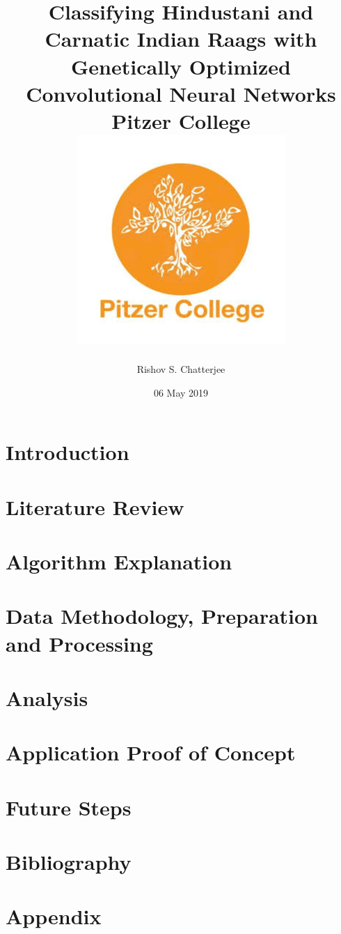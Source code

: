 \documentclass[12pt]{report}
\title{
{Classifying Hindustani and Carnatic Indian Raags with Genetically Optimized Convolutional Neural Networks}\\
{\large Pitzer College}\\
{\includegraphics{university_1.png}}
}
\author{Rishov S. Chatterjee}
\date{06 May 2019}
\begin{document}
\maketitle{}
\chapter{Introduction}


\chapter{Literature Review}


\chapter{Algorithm Explanation}


\chapter{Data Methodology, Preparation and Processing}


\chapter{Analysis}


\chapter{Application Proof of Concept}


\chapter{Future Steps}


\chapter{Bibliography}


\appendix
\chapter{Appendix}

\end{document}

